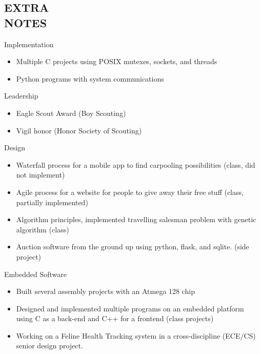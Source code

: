 \documentclass[mm]{res}
\begin{document}
\begin{resume}
\section{EXTRA \\ NOTES}     
	Implementation
		\begin{itemize}
			\item Multiple C projects using POSIX mutexes, sockets, and threads
			\item Python programs with system communications
		\end{itemize}    
            Leadership
		\begin{itemize}
			\item Eagle Scout Award (Boy Scouting)
			\item Vigil honor (Honor Society of Scouting)
		\end{itemize}
	Design
		\begin{itemize}
			\item Waterfall process for a mobile app to find carpooling possibilities (class, did not implement)
			\item Agile process for a website for people to give away their free stuff (class, partially implemented)
			\item Algorithm principles, implemented travelling salesman problem with genetic algorithm (class)
      \item Auction software from the ground up using python, flask, and sqlite. (side project)
		\end{itemize}
	Embedded Software
		\begin{itemize}
			\item Built several assembly projects with an Atmega 128 chip
			\item Designed and implemented multiple programs on an embedded platform using C as a back-end and C++ for a frontend (class projects)
      \item Working on a Feline Health Tracking system in a cross-discipline (ECE/CS) senior design project.
 		\end{itemize}

\end{resume}
\end{document}
